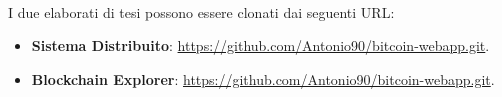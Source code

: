 \\I due elaborati di tesi possono essere clonati dai seguenti URL:
\begin{itemize}
\item \textbf{Sistema Distribuito}: \href{https://github.com/Antonio90/bitcoin-webapp.git}{https://github.com/Antonio90/bitcoin-webapp.git}.
\item \textbf{Blockchain Explorer}: \href{https://github.com/Antonio90/bitcoin-webapp.git}{https://github.com/Antonio90/bitcoin-webapp.git}. 
\end{itemize}